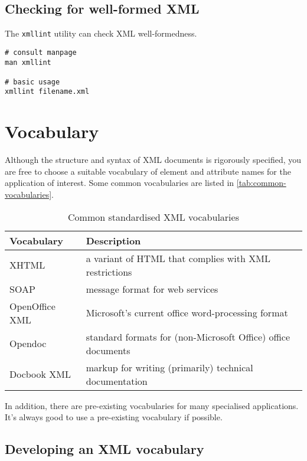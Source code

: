 \documentclass[slides]{pgnotes}
\begin{document}
\subsection{Checking for well-formed XML}

The \texttt{xmllint} utility can check XML well-formedness.

\begin{verbatim}
# consult manpage
man xmllint

# basic usage
xmllint filename.xml 
\end{verbatim}
 
  








\section{Vocabulary}

Although the structure and syntax of XML documents is rigorously specified, you are free to choose a suitable vocabulary of element and attribute names for the application of interest.
Some common vocabularies are listed in \autoref{tab:common-vocabularies}. 

\begin{table}[htbp]
  \centering
  \begin{tabularx}{1.0\linewidth}{l X}
    \toprule
    \textbf{Vocabulary} & \textbf{Description} \\
    \midrule
    XHTML & a variant of HTML that complies with XML restrictions \\
    SOAP & message format for web services \\
    OpenOffice XML & Microsoft's current office word-processing format \\
    Opendoc & standard formats for (non-Microsoft Office) office documents \\
    Docbook XML & markup for writing (primarily) technical documentation  \\
    \bottomrule
  \end{tabularx}
  \caption{Common standardised XML vocabularies}
  \label{tab:common-vocabularies}
\end{table}

In addition, there are pre-existing vocabularies for many specialised applications.
It's always good to use a pre-existing vocabulary if possible. 

\subsection{Developing an XML vocabulary}
\end{document}
